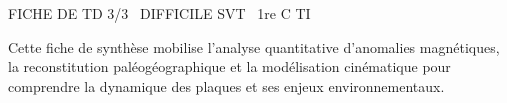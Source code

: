 \documentclass[11pt]{article}
\begin{document}
\begin{tcolorbox}[enhanced,colback=popink,colframe=popink,arc=10pt,boxrule=0pt,left=12pt,right=12pt,top=9pt,bottom=9pt]
{\color{white}\popxbold\small FICHE DE TD 3/3 \textbullet\ DIFFICILE \hfill SVT \textbullet\ 1re C TI\par}
\end{tcolorbox}
\vspace{4pt}
\noindent Cette fiche de synthèse mobilise l'analyse quantitative d'anomalies magnétiques, la reconstitution paléogéographique et la modélisation cinématique pour comprendre la dynamique des plaques et ses enjeux environnementaux.
\end{document}
